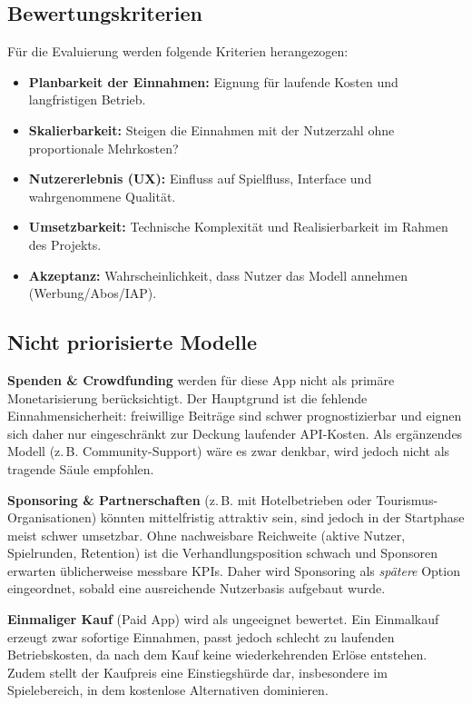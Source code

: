 \subsection{Bewertungskriterien}
Für die Evaluierung werden folgende Kriterien herangezogen:
\begin{itemize}
    \item \textbf{Planbarkeit der Einnahmen:} Eignung für laufende Kosten und langfristigen Betrieb.
    \item \textbf{Skalierbarkeit:} Steigen die Einnahmen mit der Nutzerzahl ohne proportionale Mehrkosten?
    \item \textbf{Nutzererlebnis (UX):} Einfluss auf Spielfluss, Interface und wahrgenommene Qualität.
    \item \textbf{Umsetzbarkeit:} Technische Komplexität und Realisierbarkeit im Rahmen des Projekts.
    \item \textbf{Akzeptanz:} Wahrscheinlichkeit, dass Nutzer das Modell annehmen (Werbung/Abos/IAP).
\end{itemize}

\subsection{Nicht priorisierte Modelle}
\textbf{Spenden \& Crowdfunding} werden für diese App nicht als primäre Monetarisierung berücksichtigt. Der Hauptgrund ist die fehlende Einnahmensicherheit: freiwillige Beiträge sind schwer prognostizierbar und eignen sich daher nur eingeschränkt zur Deckung laufender API-Kosten. Als ergänzendes Modell (z.\,B. Community-Support) wäre es zwar denkbar, wird jedoch nicht als tragende Säule empfohlen.

\textbf{Sponsoring \& Partnerschaften} (z.\,B. mit Hotelbetrieben oder Tourismus-Organisationen) könnten mittelfristig attraktiv sein, sind jedoch in der Startphase meist schwer umsetzbar. Ohne nachweisbare Reichweite (aktive Nutzer, Spielrunden, Retention) ist die Verhandlungsposition schwach und Sponsoren erwarten üblicherweise messbare \gls{KPIs}. Daher wird Sponsoring als \textit{spätere} Option eingeordnet, sobald eine ausreichende Nutzerbasis aufgebaut wurde.

\textbf{Einmaliger Kauf} (Paid App) wird als ungeeignet bewertet. Ein Einmalkauf erzeugt zwar sofortige Einnahmen, passt jedoch schlecht zu laufenden Betriebskosten, da nach dem Kauf keine wiederkehrenden Erlöse entstehen. Zudem stellt der Kaufpreis eine Einstiegshürde dar, insbesondere im Spielebereich, in dem kostenlose Alternativen dominieren.

